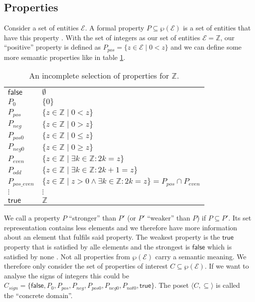 \documentclass{report}
\begin{document}
\subsection{Properties}

Consider a set of entities $\mathcal{E}$. A formal property $P\subseteq \wp(\mathcal{E}) $ is a set of entities that have this property \cite[chapter 8]{cousot2021}. With the set of integers as our set of entities $\mathcal{E}=\mathbb{Z}$, our ``positive'' property is defined as $P_{pos}=\{z\in \mathcal{E} \;|\; 0<z\}$ and we can define some more semantic properties like in table \ref{table:properties}.
\begin{table}[hbt]
\begin{center}
  \begin{tabular}{l|l}
  $\mathsf{false}$ & $\emptyset$\\
   $P_{0}$ & $\{0\}$\\
   $P_{pos}$ & $\{z\in \mathbb{Z} \;|\; 0<z\}$\\
   $P_{neg}$ & $\{z\in \mathbb{Z} \;|\; 0>z\}$\\
   $P_{pos0}$ & $\{z\in \mathbb{Z} \;|\; 0\leq z\}$\\
   $P_{neg0}$ & $\{z\in \mathbb{Z} \;|\; 0\geq z\}$\\
   $P_{even}$ & $\{z\in \mathbb{Z} \;|\; \exists k\in\mathbb{Z}:2k=z \}$ \\
   $P_{odd}$ & $\{z\in \mathbb{Z} \;|\; \exists k\in\mathbb{Z}:2k+1=z \}$ \\
   $P_{pos\_even}$ & $\{z\in \mathbb{Z} \;|\; z>0 \wedge \exists k\in\mathbb{Z}:2k=z \} = P_{pos} \cap P_{even}$ \\
   $\vdots$ &$\vdots$\\
   $\mathsf{true}$ & $\mathbb{Z}$\\
  \end{tabular}
  \caption{An incomplete selection of properties for $\mathbb{Z}$.}\label{table:properties}
  \end{center}
\end{table}

We call a property $P$ ``stronger'' than $P'$ (or $P'$ ``weaker'' than $P$) if $P\subseteq P'$. Its set representation contains less elements and we therefore have more information about an element that fulfils said property. The weakest property is the $\mathsf{true}$ property that is satisfied by alle elements and the strongest is $\mathsf{false}$ which is satisfied by none \cite[chapter 8]{cousot2021}. Not all properties from $\wp(\mathcal{E})$ carry a semantic meaning. We therefore only consider the set of properties of interest $C\subseteq\wp(\mathcal{E})$. If we want to analyse the signs of integers this could be $C_{sign}=\{\mathsf{false}, P_{0}, P_{pos}, P_{neg}, P_{pos0}, P_{neg0}, P_{not0}, \mathsf{true}\}$. The poset  $\langle C,\subseteq\rangle$ is called the ``concrete domain''.
\end{document}
